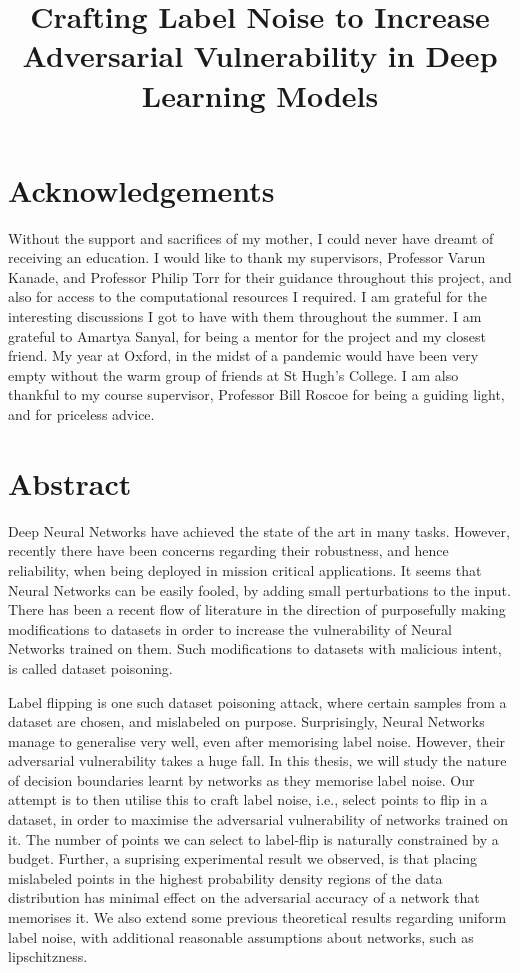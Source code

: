\documentclass[12pt, oneside]{book}
\title{Crafting Label Noise to Increase Adversarial Vulnerability in Deep
Learning Models}
\date{}
\begin{document}
\maketitle

\chapter*{Acknowledgements}
Without the support and sacrifices of my mother, I could never have dreamt of
receiving an education. I would like to thank my supervisors, Professor Varun
Kanade, and Professor Philip Torr for their guidance throughout this project,
and also for access to the computational resources I required. I am grateful for
the interesting discussions I got to have with them throughout the summer. I am
grateful to Amartya Sanyal, for being a mentor for the project and my closest
friend. My year at Oxford, in the midst of a pandemic would have been very empty
without the warm group of friends at St Hugh's College. I am also thankful to my
course supervisor, Professor Bill Roscoe for being a guiding light, and for
priceless advice.

\chapter*{Abstract}
Deep Neural Networks have achieved the state of the art in many tasks. However,
recently there have been concerns regarding their robustness, and hence
reliability, when being deployed in mission critical applications. It seems that
Neural Networks can be easily fooled, by adding small perturbations to the
input. There has been a recent flow of literature in the direction of
purposefully making modifications to datasets in order to increase the
vulnerability of Neural Networks trained on them. Such modifications to datasets
with malicious intent, is called dataset poisoning.

Label flipping is one such dataset poisoning attack, where certain samples from
a dataset are chosen, and mislabeled on purpose. Surprisingly, Neural Networks
manage to generalise very well, even after memorising label noise. However,
their adversarial vulnerability takes a huge fall. In this thesis, we will study
the nature of decision boundaries learnt by networks as they memorise label
noise. Our attempt is to then utilise this to craft label noise, i.e., select
points to flip in a dataset, in order to maximise the adversarial vulnerability
of networks trained on it. The number of points we can select to label-flip is
naturally constrained by a budget. Further, a suprising experimental result we
observed, is that placing mislabeled points in the highest probability density
regions of the data distribution has minimal effect on the adversarial accuracy
of a network that memorises it. We also extend some previous theoretical results
regarding uniform label noise, with additional reasonable assumptions about
networks, such as lipschitzness.
\end{document}
